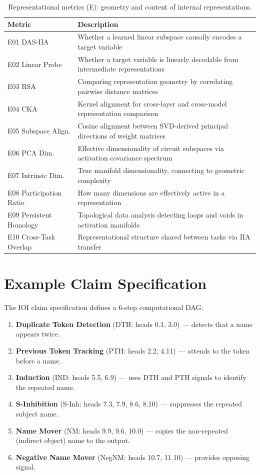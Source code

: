 \documentclass[10pt]{article}
\begin{document}
\begin{table}[H]
\centering
\small
\caption{Representational metrics (E): geometry and content of internal representations.}
\renewcommand{\arraystretch}{1.12}
\begin{tabular}{@{}lp{10cm}@{}}
\toprule
\textbf{Metric} & \textbf{Description} \\
\midrule
E01 DAS-IIA & Whether a learned linear subspace causally encodes a target variable \\
E02 Linear Probe & Whether a target variable is linearly decodable from intermediate representations \\
E03 RSA & Comparing representation geometry by correlating pairwise distance matrices \\
E04 CKA & Kernel alignment for cross-layer and cross-model representation comparison \\
E05 Subspace Align. & Cosine alignment between SVD-derived principal directions of weight matrices \\
E06 PCA Dim. & Effective dimensionality of circuit subspaces via activation covariance spectrum \\
E07 Intrinsic Dim. & True manifold dimensionality, connecting to geometric complexity \\
E08 Participation Ratio & How many dimensions are effectively active in a representation \\
E09 Persistent Homology & Topological data analysis detecting loops and voids in activation manifolds \\
E10 Cross-Task Overlap & Representational structure shared between tasks via IIA transfer \\
\bottomrule
\end{tabular}
\end{table}

\section{Example Claim Specification}
\label{app:ioi-spec}

The IOI claim specification defines a 6-step computational DAG:

\begin{enumerate}[nosep]
    \item \textbf{Duplicate Token Detection} (DTH: heads 0.1, 3.0) --- detects that a name appears twice.
    \item \textbf{Previous Token Tracking} (PTH: heads 2.2, 4.11) --- attends to the token before a name.
    \item \textbf{Induction} (IND: heads 5.5, 6.9) --- uses DTH and PTH signals to identify the repeated name.
    \item \textbf{S-Inhibition} (S-Inh: heads 7.3, 7.9, 8.6, 8.10) --- suppresses the repeated subject name.
    \item \textbf{Name Mover} (NM: heads 9.9, 9.6, 10.0) --- copies the non-repeated (indirect object) name to the output.
    \item \textbf{Negative Name Mover} (NegNM: heads 10.7, 11.10) --- provides opposing signal.
\end{enumerate}
\end{document}
